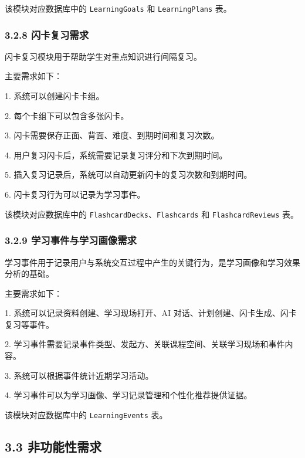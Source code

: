 \documentclass[10pt,a4paper,fontset=none]{ctexart}
\begin{document}
该模块对应数据库中的 \texttt{LearningGoals} 和 \texttt{LearningPlans} 表。\par

\subsubsection*{3.2.8 闪卡复习需求}

闪卡复习模块用于帮助学生对重点知识进行间隔复习。\par

主要需求如下：\par

1. 系统可以创建闪卡卡组。\par
2. 每个卡组下可以包含多张闪卡。\par
3. 闪卡需要保存正面、背面、难度、到期时间和复习次数。\par
4. 用户复习闪卡后，系统需要记录复习评分和下次到期时间。\par
5. 插入复习记录后，系统可以自动更新闪卡的复习次数和到期时间。\par
6. 闪卡复习行为可以记录为学习事件。\par

该模块对应数据库中的 \texttt{FlashcardDecks}、\texttt{Flashcards} 和 \texttt{FlashcardReviews} 表。\par

\subsubsection*{3.2.9 学习事件与学习画像需求}

学习事件用于记录用户与系统交互过程中产生的关键行为，是学习画像和学习效果分析的基础。\par

主要需求如下：\par

1. 系统可以记录资料创建、学习现场打开、AI 对话、计划创建、闪卡生成、闪卡复习等事件。\par
2. 学习事件需要记录事件类型、发起方、关联课程空间、关联学习现场和事件内容。\par
3. 系统可以根据事件统计近期学习活动。\par
4. 学习事件可以为学习画像、学习记录管理和个性化推荐提供证据。\par

该模块对应数据库中的 \texttt{LearningEvents} 表。\par

\subsection*{3.3 非功能性需求}
\end{document}
